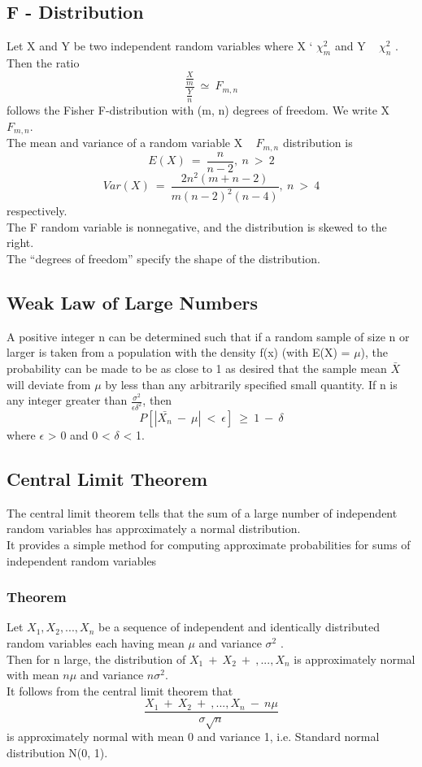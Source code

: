 \subsection*{F {-} Distribution}
Let X and Y be two independent random variables where X ` $\chi_m^2$
and Y ~ $\chi_n^2$ . Then the ratio
\[ \frac{\frac{X}{m}}{\frac{Y}{n}}\ \simeq\ F_{m,n} \]
follows the Fisher F{-}distribution with (m, n) degrees of freedom. We
write X ~ $F_{m,n}$.\\
The mean and variance of a random variable X ~ $F_{m,n}$ distribution is\\
\[E(X)\ =\ \frac{n}{n-2},\ n\ >\ 2\]
\[Var(X)\ =\ \frac{2n^2(m+n-2)}{m(n-2)^2(n-4)},\ n\ >\ 4\]
respectively.\\
The F random variable is non\-negative, and the distribution is skewed to the right.\\
The “degrees of freedom” specify the shape of the distribution.

\subsection*{Weak Law of Large Numbers}
A positive integer n can be determined such that if a random sample
of size n or larger is taken from a population with the density f(x)
(with E(X) = $\mu$), the probability can be made to be as close to 1 as
desired that the sample mean $\bar{X}$ will deviate from $\mu$ by less than any arbitrarily specified small quantity.
If n is any integer greater than $\frac{\sigma^2}{\epsilon\delta^2}$, then
\[ P[|\bar{X_n}\ -\ \mu|\ <\ \epsilon]\ \geq\ 1\ -\ \delta \]
where $\epsilon$ > 0 and 0 < $\delta$ < 1.

\subsection*{Central Limit Theorem}
The central limit theorem tells that the sum of
a large number of independent random variables has approximately
a normal distribution.\\
It provides a simple method for computing approximate probabilities
for sums of independent random variables
\subsubsection*{Theorem}
Let $X_1, X_2,..., X_n$ be a sequence of independent and identically
distributed random variables each having mean $\mu$ and variance $\sigma^2$ .\\
Then for n large, the distribution of $X_1\ +\ X_2\ +\ ,..., X_n$ is approximately
normal with mean $n\mu$ and variance $n\sigma^2$.\\
It follows from the central limit theorem that
\[ \frac{X_1\ +\ X_2\ +\ ,..., X_n\ -\ n\mu}{\sigma\sqrt{n}} \]
is approximately normal with mean 0 and variance 1, i.e. Standard
normal distribution N(0, 1).

